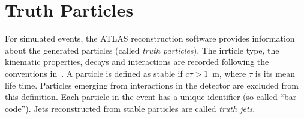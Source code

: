 \section{Truth Particles}
For simulated events, the ATLAS reconstruction software provides information about the generated 
particles (called \emph{truth particles}). The irrticle type, the kinematic properties, decays and 
interactions are recorded following the conventions  in~\cite{hepmc}.
A particle is defined as stable if $c \tau > 1$~m, where $\tau$ is its mean life time. Particles emerging from 
interactions in the detector are excluded from this definition. 
Each particle in the event has a unique identifier (so-called ``bar-code''). 
Jets reconstructed from stable particles are called \emph{truth jets}.























